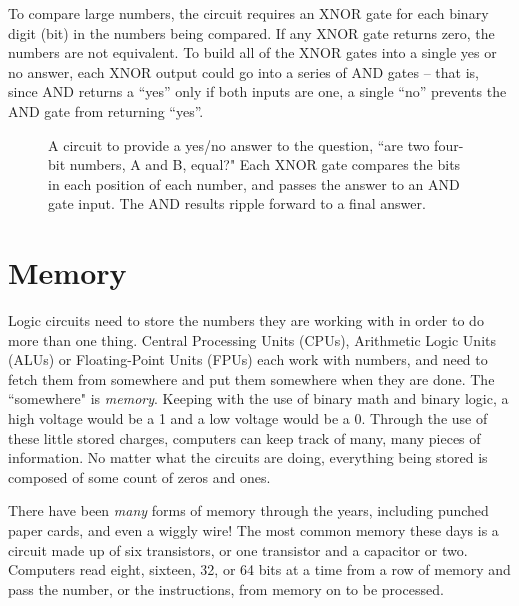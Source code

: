 To compare large numbers, the circuit requires an XNOR gate for each binary digit (bit) in the numbers being compared. If any XNOR gate returns zero, the numbers are not equivalent. To build all of the XNOR gates into a single yes or no answer, each XNOR output could go into a series of AND gates -- that is, since AND returns a ``yes'' only if both inputs are one, a single ``no'' prevents the AND gate from returning ``yes''. 


\begin{figure}[h!]
\begin{center}

\caption{A circuit to provide a yes/no answer to the question, ``are  two four-bit numbers, A and B, equal?" Each XNOR gate compares the bits in each position of each number, and passes the answer to an AND gate input. The AND results ripple forward to a final answer.}
\end{center}
\end{figure}



\clearpage


\newpage
\section*{Memory}

Logic circuits need to store the numbers they are working with in order to do more than one thing. Central Processing Units (CPUs), Arithmetic Logic Units (ALUs) or Floating-Point Units (FPUs) each work with numbers, and need to fetch them from somewhere and put them somewhere when they are done. The ``somewhere" is \emph{memory}. Keeping with the use of binary math and binary logic, a high voltage would be a 1 and a low voltage would be a 0. Through the use of these little stored charges, computers can keep track of many, many pieces of information. No matter what the circuits are doing, everything being stored is composed of some count of zeros and ones. 

There have been \emph{many} forms of memory through the years, including punched paper cards, and even a wiggly wire! The most common memory these days is a circuit made up of six transistors, or one transistor and a capacitor or two. Computers read eight, sixteen, 32, or 64 bits at a time from a row of memory and pass the number, or the instructions, from memory on to be processed.

